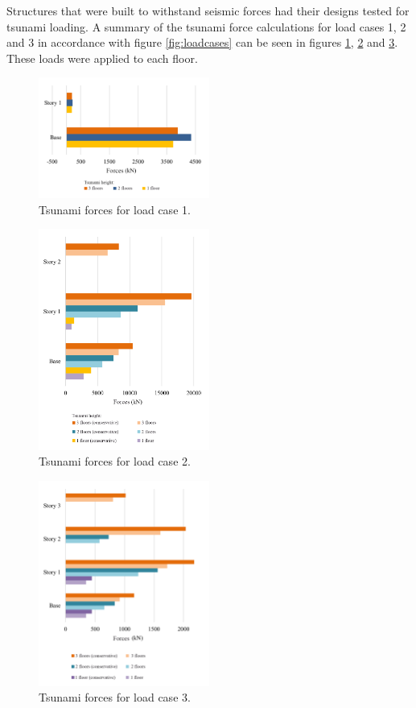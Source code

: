 \documentclass{cup-pan}
\begin{document}
Structures that were built to withstand seismic forces had their designs tested for tsunami loading. A summary of the tsunami force calculations for load cases 1, 2 and 3 in accordance with figure \ref{fig:loadcases} can be seen in figures \ref{fig:lc1}, \ref{fig:lc2} and \ref{fig:lc3}. These loads were applied to each floor.

\begin{figure}[H]
\centering
\includegraphics[width=0.5\textwidth]{Picture9_engels.png}
\caption{Tsunami forces for load case 1.}
\label{fig:lc1}
\end{figure}

\begin{figure}[H]
\centering
\includegraphics[width=0.5\textwidth]{Picture10_engels.png}
\caption{Tsunami forces for load case 2.}
\label{fig:lc2}
\end{figure}

\begin{figure}[H]
\centering
\includegraphics[width=0.5\textwidth]{Picture11_engels.png}
\caption{Tsunami forces for load case 3.}
\label{fig:lc3}
\end{figure}
\end{document}
